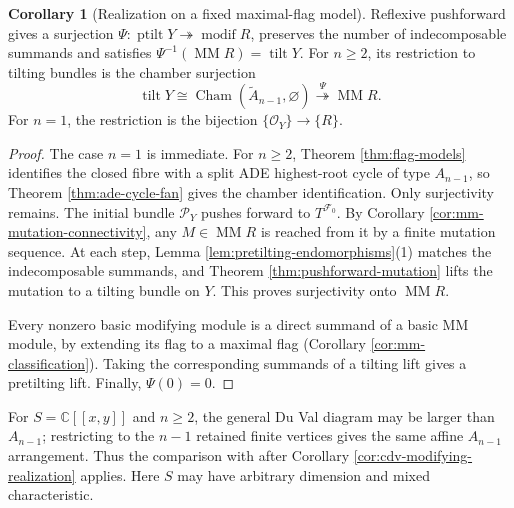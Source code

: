 \documentclass[a4paper,reqno]{amsart}
\def\F{\mathcal{F}}
\def\O{\mathcal{O}}
\def\P{\mathcal{P}}
\DeclareMathOperator{\tilt}{tilt}
\DeclareMathOperator{\ptilt}{ptilt}
\DeclareMathOperator{\modif}{modif}
\DeclareMathOperator{\MM}{MM}
\theoremstyle{definition}
\newtheorem{Cor}[Thm]{Corollary}
\begin{document}
\begin{Cor}[Realization on a fixed maximal-flag model]\label{thm:tilting-modifying-surjection}
Reflexive pushforward gives a surjection $\Psi\colon\ptilt Y\twoheadrightarrow\modif R$, preserves the number of indecomposable summands and satisfies $\Psi^{-1}(\MM R)=\tilt Y$. For $n\ge2$, its restriction to tilting bundles is the chamber surjection
\begin{equation}\label{eq:tilting-modifying-surjections}
\tilt Y\cong\operatorname{Cham}(\widetilde A_{n-1},\varnothing)
\overset{\Psi}{\twoheadrightarrow}\MM R.
\end{equation}
For $n=1$, the restriction is the bijection $\{\O_Y\}\to\{R\}$.
\end{Cor}
\begin{proof}
The case $n=1$ is immediate. For $n\ge2$, Theorem \ref{thm:flag-models} identifies the closed fibre with a split ADE highest-root cycle of type $A_{n-1}$, so Theorem \ref{thm:ade-cycle-fan} gives the chamber identification. Only surjectivity remains. The initial bundle $\P_Y$ pushes forward to $T^{\F_0}$. By Corollary \ref{cor:mm-mutation-connectivity}, any $M\in\MM R$ is reached from it by a finite mutation sequence. At each step, Lemma \ref{lem:pretilting-endomorphisms}(1) matches the indecomposable summands, and Theorem \ref{thm:pushforward-mutation} lifts the mutation to a tilting bundle on $Y$. This proves surjectivity onto $\MM R$.

Every nonzero basic modifying module is a direct summand of a basic MM module, by extending its flag to a maximal flag (Corollary \ref{cor:mm-classification}). Taking the corresponding summands of a tilting lift gives a pretilting lift. Finally, $\Psi(0)=0$.
\end{proof}

For $S=\mathbb C[[x,y]]$ and $n\ge2$, the general Du Val diagram may be larger than $A_{n-1}$; restricting to the $n-1$ retained finite vertices gives the same affine $A_{n-1}$ arrangement. Thus the comparison with \cite[Theorem 0.13]{IWTC} after Corollary \ref{cor:cdv-modifying-realization} applies. Here $S$ may have arbitrary dimension and mixed characteristic.
\end{document}
